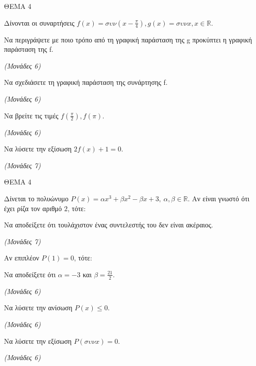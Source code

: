\documentclass[11pt,a4paper,twoside]{book}
\newcommand{\monades}[1]{\hfill \textit{(Μονάδες #1)}}
\begin{document}
\vspace{4mm}

ΘΕΜΑ 4

Δίνονται οι συναρτήσεις $f(x) = \sigma\upsilon\nu\left(x - \frac{\pi}{4}\right), g(x) = \sigma\upsilon\nu x, x \in \mathbb{R}$.

\begin{alist}
\item Να περιγράψετε με ποιο τρόπο από τη γραφική παράσταση της g προκύπτει η γραφική παράσταση της f.

\monades{6}

\item Να σχεδιάσετε τη γραφική παράσταση της συνάρτησης f.

\monades{6}

\item Να βρείτε τις τιμές $f\left(\frac{\pi}{2}\right), f(\pi)$.

\monades{6}

\item Να λύσετε την εξίσωση $2f(x) + 1 = 0$.

\monades{7}
\end{alist}

\vspace{4mm}

ΘΕΜΑ 4

Δίνεται το πολυώνυμο $P(x) = \alpha x^3 + \beta x^2 - \beta x + 3, \ \alpha, \beta \in \mathbb{R}$. Αν είναι γνωστό ότι έχει ρίζα τον αριθμό $2$, τότε:

\begin{alist}
\item Να αποδείξετε ότι τουλάχιστον ένας συντελεστής του δεν είναι ακέραιος.

\monades{7}

Αν επιπλέον $P(1) = 0$, τότε:

\item Να αποδείξετε ότι $\alpha = -3$ και $\beta = \frac{21}{2}$.

\monades{6}

\item Να λύσετε την ανίσωση $P(x) \le 0$.

\monades{6}

\item Να λύσετε την εξίσωση $P(\sigma\upsilon\nu x) = 0$.

\monades{6}
\end{alist}

\vspace{4mm}
\end{document}
